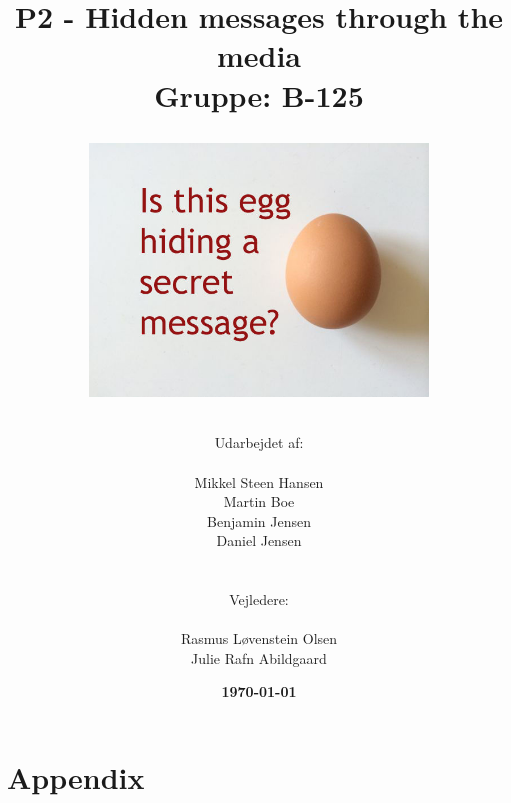 \documentclass[11pt]{article}
\title{
    P2 - Hidden messages through the media 
    \\ 
    Gruppe: B-125
    \\
    \begin{figure}[!h]
        \centering
        \includegraphics[width=0.8\textwidth, angle =0]{Projectdoc/Egg-Message.jpg}
        \label{fig:FrontPage}
    \end{figure}
}
\author{
    Udarbejdet af:\\
    \\
    Mikkel Steen Hansen\\
    Martin Boe\\
    Benjamin Jensen\\
    Daniel Jensen\\
    \\\\
    Vejledere:\\ 
    \\
    Rasmus Løvenstein Olsen\\
    Julie Rafn Abildgaard\\
}
\date{\textbf{\today}}
\renewcommand{\baselinestretch}{1.20}
\begin{document}
    \begin{titlepage}
        \clearpage
        \maketitle
        \thispagestyle{empty}
    \end{titlepage}
    
    
    
    \renewcommand{\baselinestretch}{0.8} 
    \tableofcontents
    \renewcommand{\baselinestretch}{1.20} 
    \newpage
    
    
    
    
    
    
    
    
    
    
    
    \newpage
    
    
    \newpage
    
    
    
    
    \newpage
    
    
    
    \newpage
    \section{Appendix}
    
\end{document}
